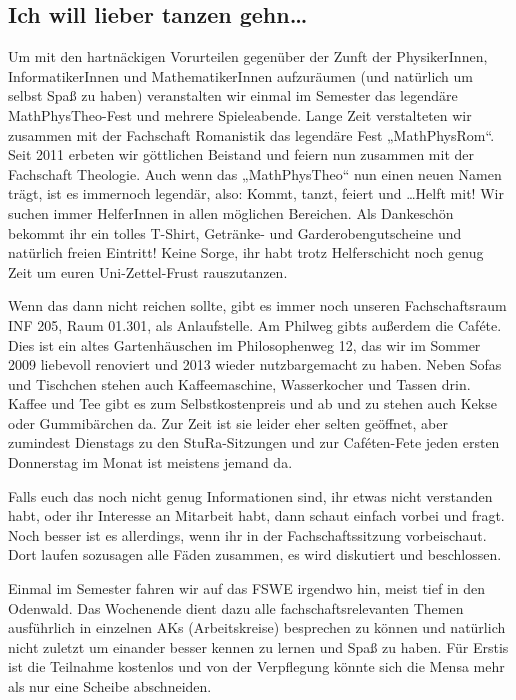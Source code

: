 \subsection*{Ich will lieber tanzen gehn\dots}
Um mit den hartnäckigen Vorurteilen gegenüber der Zunft der PhysikerInnen,
InformatikerInnen und MathematikerInnen aufzuräumen (und natürlich um selbst
Spaß zu haben) veranstalten wir einmal im Semester das legendäre
MathPhysTheo-Fest und  mehrere Spieleabende.  Lange Zeit verstalteten wir
zusammen mit der Fachschaft Romanistik das legendäre Fest „MathPhysRom“. Seit
2011 erbeten wir göttlichen Beistand und feiern nun zusammen mit der Fachschaft
Theologie. Auch wenn das „MathPhysTheo“ nun einen neuen Namen trägt, ist es
immernoch legendär, also: Kommt, tanzt, feiert und \dots Helft mit! Wir suchen
immer HelferInnen in allen möglichen Bereichen. Als Dankeschön bekommt ihr ein
tolles T-Shirt, Getränke- und Garderobengutscheine und natürlich freien
Eintritt! Keine Sorge, ihr habt trotz Helferschicht noch genug Zeit um euren
Uni-Zettel-Frust rauszutanzen.

Wenn das dann nicht reichen sollte, gibt es immer noch unseren Fachschaftsraum
INF 205, Raum 01.301, als Anlaufstelle.  Am Philweg gibts außerdem die Caféte.
Dies ist ein altes Gartenhäuschen im Philosophenweg 12, das wir im Sommer 2009
liebevoll renoviert und 2013 wieder nutzbargemacht zu haben. Neben Sofas und
Tischchen stehen auch Kaffeemaschine, Wasserkocher und Tassen drin. Kaffee und
Tee gibt es zum Selbstkostenpreis und ab und zu stehen auch Kekse oder
Gummibärchen da. Zur Zeit ist sie leider eher selten geöffnet, aber zumindest
Dienstags zu den \gls{StuRa}-Sitzungen und zur Caféten-Fete jeden ersten
Donnerstag im Monat ist meistens jemand da.

Falls euch das noch nicht genug Informationen sind, ihr etwas nicht verstanden
habt, oder ihr Interesse an Mitarbeit habt, dann schaut einfach vorbei und
fragt. Noch besser ist es allerdings, wenn ihr in der Fachschaftssitzung
vorbeischaut. Dort laufen sozusagen alle Fäden zusammen, es wird diskutiert und
beschlossen.

Einmal im Semester fahren wir auf das \gls{FSWE} irgendwo hin, meist tief in
den Odenwald. Das Wochenende dient dazu alle fachschaftsrelevanten Themen
ausführlich in einzelnen AKs (Arbeitskreise) besprechen zu können und natürlich
nicht zuletzt um einander besser kennen zu lernen und Spaß zu haben. Für Erstis
ist die Teilnahme kostenlos und von der Verpflegung könnte sich die Mensa mehr
als nur eine Scheibe abschneiden.
